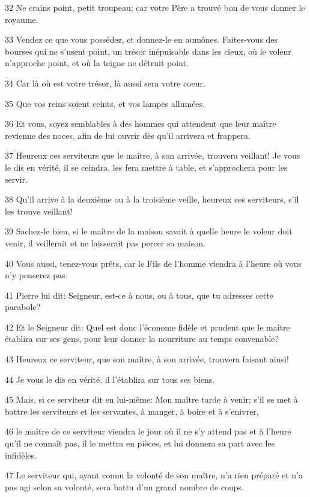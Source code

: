 \par 32 Ne crains point, petit troupeau; car votre Père a trouvé bon de vous donner le royaume.
\par 33 Vendez ce que vous possédez, et donnez-le en aumônes. Faites-vous des bourses qui ne s'usent point, un trésor inépuisable dans les cieux, où le voleur n'approche point, et où la teigne ne détruit point.
\par 34 Car là où est votre trésor, là aussi sera votre coeur.
\par 35 Que vos reins soient ceints, et vos lampes allumées.
\par 36 Et vous, soyez semblables à des hommes qui attendent que leur maître revienne des noces, afin de lui ouvrir dès qu'il arrivera et frappera.
\par 37 Heureux ces serviteurs que le maître, à son arrivée, trouvera veillant! Je vous le dis en vérité, il se ceindra, les fera mettre à table, et s'approchera pour les servir.
\par 38 Qu'il arrive à la deuxième ou à la troisième veille, heureux ces serviteurs, s'il les trouve veillant!
\par 39 Sachez-le bien, si le maître de la maison savait à quelle heure le voleur doit venir, il veillerait et ne laisserait pas percer sa maison.
\par 40 Vous aussi, tenez-vous prêts, car le Fils de l'homme viendra à l'heure où vous n'y penserez pas.
\par 41 Pierre lui dit: Seigneur, est-ce à nous, ou à tous, que tu adresses cette parabole?
\par 42 Et le Seigneur dit: Quel est donc l'économe fidèle et prudent que le maître établira sur ses gens, pour leur donner la nourriture au temps convenable?
\par 43 Heureux ce serviteur, que son maître, à son arrivée, trouvera faisant ainsi!
\par 44 Je vous le dis en vérité, il l'établira sur tous ses biens.
\par 45 Mais, si ce serviteur dit en lui-même: Mon maître tarde à venir; s'il se met à battre les serviteurs et les servantes, à manger, à boire et à s'enivrer,
\par 46 le maître de ce serviteur viendra le jour où il ne s'y attend pas et à l'heure qu'il ne connaît pas, il le mettra en pièces, et lui donnera sa part avec les infidèles.
\par 47 Le serviteur qui, ayant connu la volonté de son maître, n'a rien préparé et n'a pas agi selon sa volonté, sera battu d'un grand nombre de coups.
